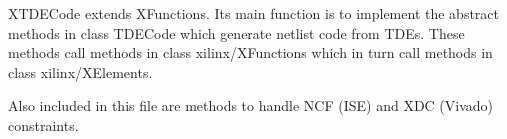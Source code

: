 XTDECode extends XFunctions. Its main function is to implement the
abstract methods in class TDECode which generate netlist code from
TDEs. These methods call methods in class xilinx/XFunctions which in
turn call methods in class xilinx/XElements.

Also included in this file are methods to handle NCF (ISE) and XDC
(Vivado) constraints.

